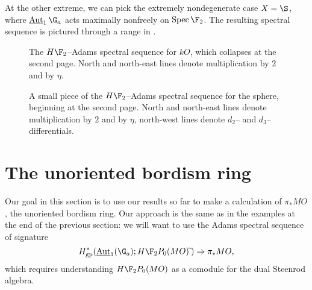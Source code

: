 \begin{example}
\end{example}

\begin{example}
At the other extreme, we can pick the extremely nondegenerate case $X = \S$, where $\InternalAut_1 \G_a$ acts maximally nonfreely on $\Spec \F_2$.  The resulting spectral sequence is pictured through a range in .
\end{example}


\begin{landscape}
\begin{figure}[b]


\caption{The $H\F_2$--Adams spectral sequence for $kO$, which collapses at the second page.  North and north-east lines denote multiplication by $2$ and by $\eta$.}\label{kOASSFigure}
\end{figure}
\begin{figure}[b]


\caption{A small piece of the $H\F_2$--Adams spectral sequence for the sphere, beginning at the second page.  North and north-east lines denote multiplication by $2$ and by $\eta$, north-west lines denote $d_2$-- and $d_3$--differentials.}\label{HF2ASSFigure}
\end{figure}
\end{landscape}











\section{The unoriented bordism ring}

Our goal in this section is to use our results so far to make a calculation of $\pi_* MO$, the unoriented bordism ring.  Our approach is the same as in the examples at the end of the previous section: we will want to use the Adams spectral sequence of signature \[H^*_{\mathrm{gp}}(\InternalAut_1(\G_a); H\F_2P_0(MO)\widetilde{\:}) \Rightarrow \pi_* MO,\] which requires understanding $H\F_2P_0(MO)$ as a comodule for the dual Steenrod algebra.

